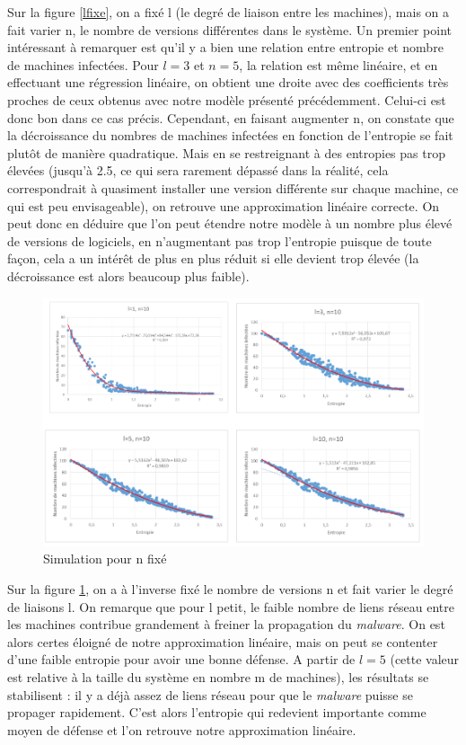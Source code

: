 Sur la figure \ref{lfixe}, on a fixé l (le degré de liaison entre les machines), mais on a fait varier n, le nombre de versions différentes dans le système. Un premier point intéressant à remarquer est qu'il y a bien une relation entre entropie et nombre de machines infectées. Pour $l=3$ et $n=5$, la relation est même linéaire, et en effectuant une régression linéaire, on obtient une droite avec des coefficients très proches de ceux obtenus avec notre modèle présenté précédemment. Celui-ci est donc bon dans ce cas précis.
Cependant, en faisant augmenter n, on constate que la décroissance du nombres de machines infectées en fonction de l'entropie se fait plutôt de manière quadratique. Mais en se restreignant à des entropies pas trop élevées (jusqu'à 2.5, ce qui sera rarement dépassé dans la réalité, cela correspondrait à quasiment installer une version différente sur chaque machine, ce qui est peu envisageable), on retrouve une approximation linéaire correcte. On peut donc en déduire que l'on peut étendre notre modèle à un nombre plus élevé de versions de logiciels, en n'augmentant pas trop l'entropie puisque de toute façon, cela a un intérêt de plus en plus réduit si elle devient trop élevée (la décroissance est alors beaucoup plus faible).

\begin{figure}[!ht]
\centering
     \includegraphics[width=1.0\linewidth]{Paul/python/nfixe.png}
     \caption{Simulation pour n fixé}
     \label{nfixe}
\end{figure}

Sur la figure \ref{nfixe}, on a à l'inverse fixé le nombre de versions n et fait varier le degré de liaisons l. On remarque que pour l petit, le faible nombre de liens réseau entre les machines contribue grandement à freiner la propagation du \textit{malware}. On est alors certes éloigné de notre approximation linéaire, mais on peut se contenter d'une faible entropie pour avoir une bonne défense. A partir de $l=5$ (cette valeur est relative à la taille du système en nombre m de machines), les résultats se stabilisent : il y a déjà assez de liens réseau pour que le \textit{malware} puisse se propager rapidement. C'est alors l'entropie qui redevient importante comme moyen de défense et l'on retrouve notre approximation linéaire.